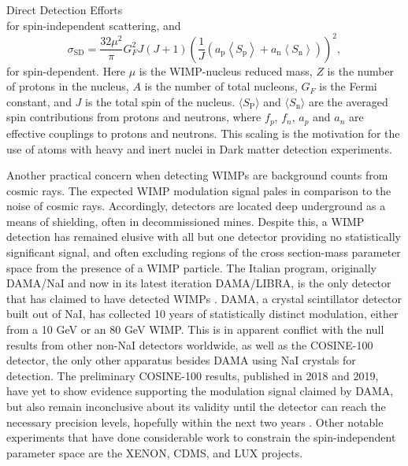 \documentclass[a4paper,11pt]{article}
\begin{document}
\begin{section}{Direct Detection Efforts}
\begin{equation}
    \end{equation}
    for spin-independent scattering, and
    \begin{equation}
        \sigma_{\mathrm{SD}}=\frac{32 \mu^{2}}{\pi} G_{F}^{2} J(J+1) \left( \frac{1}{J}\left(a_{\mathrm{p}}\left\langle S_{\mathrm{p}}\right\rangle+a_{\mathrm{n}}\left\langle S_{\mathrm{n}}\right\rangle\right)\right)^{2},
    \end{equation}
    for spin-dependent.
    Here $\mu$ is the WIMP-nucleus reduced mass, $Z$ is the number of protons in the nucleus, $A$ is the number of total nucleons, $G_F$ is the Fermi constant, and $J$ is the total spin of the nucleus.
    $\langle S_{\mathrm{P}}\rangle$ and $\langle S_{\mathrm{n}}\rangle$ are the averaged spin contributions from protons and neutrons, where $f_p$, $f_n$, $a_p$ and $a_n$ are effective couplings to protons and neutrons.
    This scaling is the motivation for the use of atoms with heavy and inert nuclei in Dark matter detection experiments.

    Another practical concern when detecting WIMPs are background counts from cosmic rays.
    The expected WIMP modulation signal pales in comparison to the noise of cosmic rays.
    Accordingly, detectors are located deep underground as a means of shielding, often in decommissioned mines.
    Despite this, a WIMP detection has remained elusive with all but one detector providing no statistically significant signal, and often excluding regions of the cross section-mass parameter space from the presence of a WIMP particle.
    The Italian program, originally  DAMA/NaI and now in its latest iteration DAMA/LIBRA, is the only detector that has claimed to have detected WIMPs \cite{Bernabei:2008} \cite{Bernabei:2018}.
    DAMA, a crystal scintillator detector built out of NaI, has collected 10 years of statistically distinct modulation, either from a 10 GeV or an 80 GeV WIMP.
    This is in apparent conflict with the null results from other non-NaI detectors worldwide, as well as the COSINE-100 detector, the only other apparatus besides DAMA using NaI crystals for detection.
    The preliminary COSINE-100 results, published in 2018 and 2019, have yet to show evidence supporting the modulation signal claimed by DAMA, but also remain inconclusive about its validity until the detector can reach the necessary precision levels, hopefully within the next two years \cite{Cosine:2018} \cite{Cosine:2019}.
    Other notable experiments that have done considerable work to constrain the spin-independent parameter space are the XENON, CDMS, and LUX projects.


\end{section}
\end{document}
